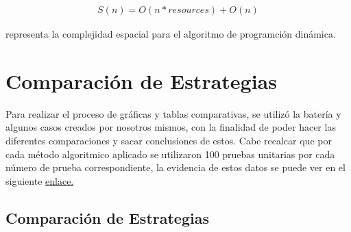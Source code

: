 \documentclass[letterpaper,10pt]{article}
\begin{document}
\begin{align*}
  S(n) = O(n*resources) + O(n)
\end{align*}

representa la complejidad espacial para el algoritmo de programción dinámica.
\section{Comparación de Estrategias}
\label{sec:comparacion_estrategias}

Para realizar el proceso de gráficas y tablas comparativas, se utilizó la batería y algunos casos creados por nosotros mismos, con la finalidad de poder hacer las diferentes comparaciones y sacar conclusiones de estos. Cabe recalcar que por cada método algoritmico aplicado se utilizaron 100 pruebas unitarias por cada número de prueba correspondiente, la evidencia de estos datos se puede ver en el siguiente \href{https://1drv.ms/x/s!Au19Z890RbcYgYp-EkAe5e8Z_uKeHA?e=RUO2BH}{enlace.}

\subsection{Comparación de Estrategias}
\end{document}
